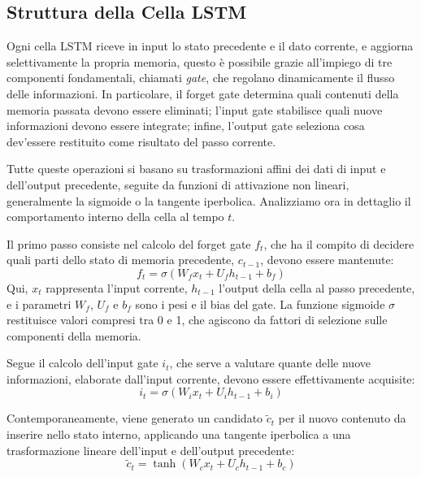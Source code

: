 \documentclass{article}
\begin{document}
\subsection{Struttura della Cella LSTM}

Ogni cella LSTM riceve in input lo stato precedente e il dato corrente, e aggiorna selettivamente 
la propria memoria, questo è possibile grazie all’impiego di tre componenti fondamentali, chiamati 
\textit{gate}, che regolano dinamicamente il flusso delle informazioni. In particolare, il forget 
gate determina quali contenuti della memoria passata devono essere eliminati; l’input gate stabilisce 
quali nuove informazioni devono essere integrate; infine, l’output gate seleziona cosa dev’essere 
restituito come risultato del passo corrente.

Tutte queste operazioni si basano su trasformazioni affini dei dati di input e dell’output precedente, 
seguite da funzioni di attivazione non lineari, generalmente la sigmoide o la tangente iperbolica. 
Analizziamo ora in dettaglio il comportamento interno della cella al tempo $t$.

Il primo passo consiste nel calcolo del forget gate $f_t$, che ha il compito di decidere quali parti 
dello stato di memoria precedente, $c_{t-1}$, devono essere mantenute:
\begin{equation}
f_t = \sigma(W_f x_t + U_f h_{t-1} + b_f)
\end{equation}
Qui, $x_t$ rappresenta l’input corrente, $h_{t-1}$ l’output della cella al passo precedente, e i 
parametri $W_f$, $U_f$ e $b_f$ sono i pesi e il bias del gate. La funzione sigmoide $\sigma$ restituisce 
valori compresi tra 0 e 1, che agiscono da fattori di selezione sulle componenti della memoria.

Segue il calcolo dell’input gate $i_t$, che serve a valutare quante delle nuove informazioni, elaborate 
dall’input corrente, devono essere effettivamente acquisite:
\begin{equation}
i_t = \sigma(W_i x_t + U_i h_{t-1} + b_i)
\end{equation}

Contemporaneamente, viene generato un candidato $\tilde{c}_t$ per il nuovo contenuto da inserire nello 
stato interno, applicando una tangente iperbolica a una trasformazione lineare dell’input e dell’output 
precedente:
\begin{equation}
\tilde{c}_t = \tanh(W_c x_t + U_c h_{t-1} + b_c)
\end{equation}
\end{document}
